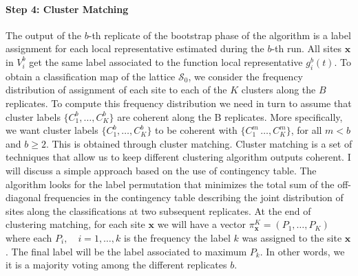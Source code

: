 \paragraph{Step 4: Cluster Matching} The output of the $b$-th replicate of the bootstrap phase of the algorithm is a label assignment for each local representative estimated during the $b$-th run. All sites $\mathbf{x}$ in $V_i^b$ get the same label associated to the function local representative $g_i^b(t)$. To obtain a classification map of the lattice $\mathcal{S}_0$, we consider the frequency distribution of assignment of each site to each of the $K$ clusters along the $B$ replicates. To compute this frequency distribution we need in turn to assume that cluster labels $\{C_1^b, \dots, C_K^b\}$ are coherent along the B replicates. More specifically, we want cluster labels $\{C_1^b, \dots, C_K^b\}$ to be coherent with $\{C_1^m\, \dots, C_K^m\}$, for all $m<b$ and $b\geq2$. This is obtained through cluster matching. Cluster matching is a set of techniques that allow us to keep different clustering algorithm outputs coherent. I will discuss a simple approach based on the use of contingency table. The algorithm looks for the label permutation that minimizes the total sum of the off-diagonal frequencies in the contingency table describing the joint distribution of sites along the classifications at two subsequent replicates. At the end of clustering matching, for each site $\mathbf{x}$ we will have a vector $\pi_{\mathbf{x}}^K=\left(P_1, \dots, P_K\right)$ where each $P_i, \quad i=1,\dots,k$ is the frequency the label $k$ was assigned to the site $\mathbf{x}$. The final label will be the label associated to maximum $P_k$. In other words, we it is a majority voting among the different replicates $b$.

